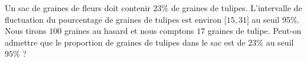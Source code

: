 
\begin{exercice}\label{exosmath-0217}

    Un sac de graines de fleurs doit contenir \( 23\%\) de graines de tulipes. L'intervalle de fluctuation du pourcentage de graines de tulipes est environ \( \mathopen[ 15 , 31 \mathclose]\) au seuil \( 95\%\). Nous tirons \( 100\) graines au hasard et nous comptons \( 17\) graines de tulipe. Peut-on admettre que le proportion de graines de tulipes dans le sac est de \( 23\%\) au seuil \( 95\%\) ?

\end{exercice}
